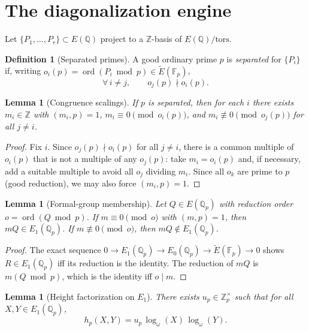 \documentclass[12pt,reqno]{amsart}
\newtheorem{lemma}[theorem]{Lemma}
\theoremstyle{definition}
\newtheorem{definition}[theorem]{Definition}
\theoremstyle{remark}
\newcommand{\Q}{\mathbb{Q}}
\newcommand{\Z}{\mathbb{Z}}
\newcommand{\Fp}{\mathbb{F}_p}
\newcommand{\Qp}{\mathbb{Q}_p}
\newcommand{\Zp}{\mathbb{Z}_p}
\DeclareMathOperator{\ord}{ord}
\begin{document}
\section{The diagonalization engine}\label{sec:diag}

Let $\{P_1,\dots,P_r\}\subset E(\Q)$ project to a $\Z$-basis of $E(\Q)/\mathrm{tors}$.

\begin{definition}[Separated primes]\label{def:separated}
A good ordinary prime $p$ is \emph{separated} for $\{P_i\}$ if, writing $o_i(p)=\ord(P_i\bmod p)\in\widetilde E(\Fp)$,
\[
\forall\,i\ne j,\qquad o_j(p)\nmid o_i(p).
\]
\end{definition}

\begin{lemma}[Congruence scalings]\label{lem:CRT}
If $p$ is separated, then for each $i$ there exists $m_i\in\Z$ with $(m_i,p)=1$, $m_i\equiv 0\pmod{o_i(p)}$, and $m_i\not\equiv 0\pmod{o_j(p)}$ for all $j\ne i$.
\end{lemma}

\begin{proof}
Fix $i$.  Since $o_j(p)\nmid o_i(p)$ for all $j\ne i$, there is a common multiple of $o_i(p)$ that is not a multiple of any $o_j(p)$: take $m_i=o_i(p)$ and, if necessary, add a suitable multiple to avoid all $o_j$ dividing $m_i$.  Since all $o_k$ are prime to $p$ (good reduction), we may also force $(m_i,p)=1$.
\end{proof}

\begin{lemma}[Formal-group membership]\label{lem:membership}
Let $Q\in E(\Qp)$ with reduction order $o=\ord(Q\bmod p)$.  If $m\equiv 0\pmod{o}$ with $(m,p)=1$, then $mQ\in E_1(\Qp)$.  If $m\not\equiv 0\pmod{o}$, then $mQ\notin E_1(\Qp)$.
\end{lemma}

\begin{proof}
The exact sequence $0\to E_1(\Qp)\to E_0(\Qp)\to\widetilde E(\Fp)\to 0$ shows $R\in E_1(\Qp)$ iff its reduction is the identity.  The reduction of $mQ$ is $m(Q\bmod p)$, which is the identity iff $o\mid m$.
\end{proof}

\begin{lemma}[Height factorization on $E_1$]\label{lem:formal-factor}
There exists $u_p\in\Zp^\times$ such that for all $X,Y\in E_1(\Qp)$,
\[
h_p(X,Y)=u_p\,\log_\omega(X)\,\log_\omega(Y).
\]
\end{lemma}
\end{document}
